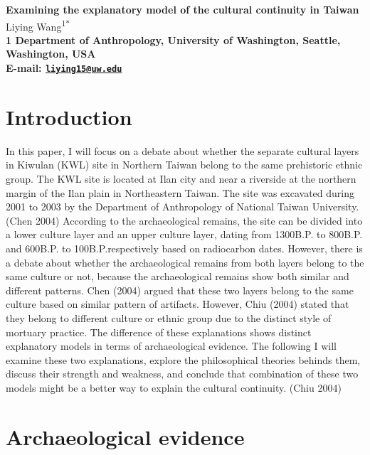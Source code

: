 \documentclass[10pt]{article}
\date{}
\begin{document}
\begin{flushleft}
{\Large
\textbf{Examining the explanatory model of the cultural continuity in Taiwan}
}
\\
  Liying Wang\textsuperscript{1*}\\
\bf{1} Department of Anthropology, University of Washington,  Seattle,  Washington,  USA
\\

\textasteriskcentered{} E-mail:   \href{mailto:liying15@uw.edu}{\nolinkurl{liying15@uw.edu}}

\end{flushleft}

\section*{Introduction}\label{introduction}

In this paper, I will focus on a debate about whether the separate
cultural layers in Kiwulan (KWL) site in Northern Taiwan belong to the
same prehistoric ethnic group. The KWL site is located at Ilan city and
near a riverside at the northern margin of the Ilan plain in
Northeastern Taiwan. The site was excavated during 2001 to 2003 by the
Department of Anthropology of National Taiwan University.(Chen 2004)
According to the archaeological remains, the site can be divided into a
lower culture layer and an upper culture layer, dating from 1300B.P. to
800B.P. and 600B.P. to 100B.P.respectively based on radiocarbon dates.
However, there is a debate about whether the archaeological remains from
both layers belong to the same culture or not, because the
archaeological remains show both similar and different patterns. Chen
(2004) argued that these two layers belong to the same culture based on
similar pattern of artifacts. However, Chiu (2004) stated that they
belong to different culture or ethnic group due to the distinct style of
mortuary practice. The difference of these explanations shows distinct
explanatory models in terms of archaeological evidence. The following I
will examine these two explanations, explore the philosophical theories
behinds them, discuss their strength and weakness, and conclude that
combination of these two models might be a better way to explain the
cultural continuity. (Chiu 2004)

\section*{Archaeological evidence}\label{archaeological-evidence}
\end{document}
